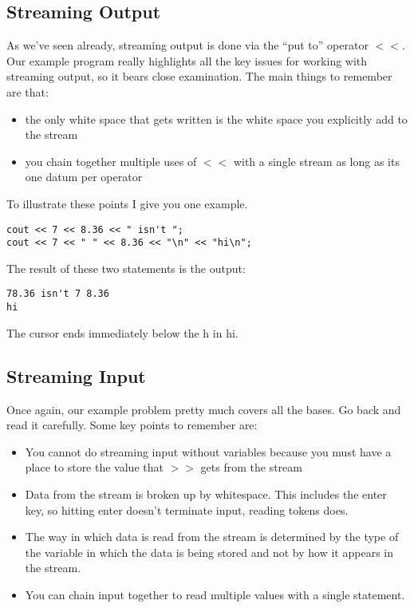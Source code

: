 \documentclass[]{tufte-handout}
\begin{document}
\subsection{Streaming Output}

As we've seen already, streaming output is done via the ``put to'' operator \textit{$<<$}. Our example program really highlights all the key issues for working with streaming output, so it bears close examination. The main things to remember are that:
\begin{itemize}
\item the only white space that gets written is the white space you explicitly add to the stream
\item you chain together multiple uses of $<<$ with a single stream as long as its one datum per operator
\end{itemize}
To illustrate these points I give you one example.
\begin{verbatim}
cout << 7 << 8.36 << " isn't ";
cout << 7 << " " << 8.36 << "\n" << "hi\n";
\end{verbatim}
The result of these two statements is the output:
\begin{verbatim}
78.36 isn't 7 8.36
hi

\end{verbatim}
The cursor ends immediately below the h in hi.

\subsection{Streaming Input}

Once again, our example problem pretty much covers all the bases. Go back and read it carefully. Some key points to remember are:
\begin{itemize}
\item You cannot do streaming input without variables because you must have a place to store the value that $>>$ gets from the stream
\item Data from the stream is broken up by whitespace. This includes the enter key, so hitting enter doesn't terminate input, reading tokens does.
\item The way in which data is read from the stream is determined by the type of the variable in which the data is being stored and not by how it appears in the stream.
\item You can chain input together to read multiple values with a single statement.
\end{itemize}
\end{document}
